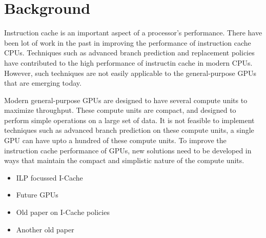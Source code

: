 \section{Background}



Instruction cache is an important aspect of a processor's performance. There have been lot of work in the past in improving the performance of instruction cache  CPUs. Techniques such as advanced branch prediction and replacement policies have contributed to the high performance of instructin cache in modern CPUs. However, such techniques are not easily applicable to the general-purpose GPUs that are emerging today. 

Modern general-purpose GPUs are designed to have several compute units to maximize throughput. These compute units are compact, and designed to perform simple operations on a large set of data. It is not feasible to implement techniques such as advanced branch prediction on these compute units, a single GPU can have upto a hundred of these compute units. To improve the instruction cache performance of GPUs, new solutions need to be developed in ways that maintain the compact and simplistic nature of the compute units.



\begin{itemize}
\item ILP focussed I-Cache~\cite{yeh93}
\item Future GPUs~\cite{keckler2011} 
\item Old paper on I-Cache policies~\cite{smith85} 
\item Another old paper~\cite{smith83} 
\end{itemize}
